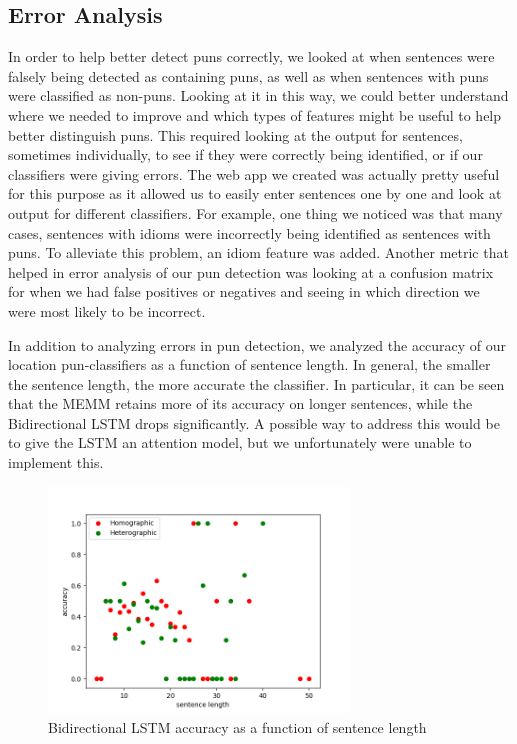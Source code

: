 \documentclass{article}
\begin{document}
\subsection{Error Analysis}

In order to help better detect puns correctly, we looked at when sentences were falsely being detected as containing puns, as well as when sentences with puns were classified as non-puns. Looking at it in this way, we could better understand where we needed to improve and which types of features might be useful to help better distinguish puns. This required looking at the output for sentences, sometimes individually, to see if they were correctly being identified, or if our classifiers were giving errors. The web app we created was actually pretty useful for this purpose as it allowed us to easily enter sentences one by one and look at output for different classifiers. For example, one thing we noticed was that many cases, sentences with idioms were incorrectly being identified as sentences with puns. To alleviate this problem, an idiom feature was added. Another metric that helped in error analysis of our pun detection was looking at a confusion matrix for when we had false positives or negatives and seeing in which direction we were most likely to be incorrect. 

In addition to analyzing errors in pun detection, we analyzed the accuracy of our location pun-classifiers as a function of
sentence length. In general, the smaller the sentence length, the more accurate
the classifier. In particular, it can be seen that the MEMM retains more of its
accuracy on longer sentences, while the Bidirectional LSTM drops significantly. 
A possible way to address this would be to give the LSTM an attention model, but
we unfortunately were unable to implement this.

\begin{figure}[h!]
    \centering
    \includegraphics[width=8cm]{figures/location-rnn.png}
	\caption{Bidirectional LSTM accuracy as a function of sentence length}
    \label{fig:method}
\end{figure}
\end{document}

